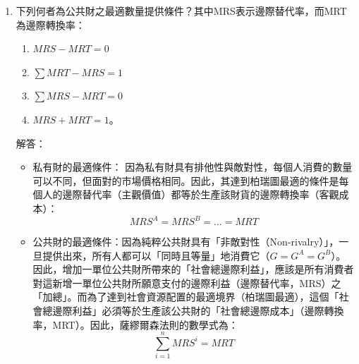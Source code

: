 \documentclass[12pt, a4paper]{article}
\begin{document}
\begin{enumerate}
    \item 下列何者為公共財之最適數量提供條件？其中MRS表示邊際替代率，而MRT為邊際轉換率：
    \begin{enumerate}[label=\Alph*.]
        \item \(MRS-MRT=0\)
        \item \(\sum MRT-MRS=1\)
        \item \(\sum MRS-MRT=0\)
        \item \(MRS+MRT=1\)。
    \end{enumerate}
    解答：
    \begin{itemize}
        \item 私有財的最適條件： 因為私有財具有排他性與敵對性，每個人消費的數量可以不同，但面對的市場價格相同。因此，其達到柏瑞圖最適的條件是每個人的邊際替代率（主觀價值）都等於生產該財貨的邊際轉換率（客觀成本）：
        \[
        MRS^A = MRS^B = \dots = MRT
        \]
        \item 公共財的最適條件：因為純粹公共財具有「非敵對性（Non-rivalry）」，一旦提供出來，所有人都可以「同時且等量」地消費它（\(G = G^A = G^B\)）。因此，增加一單位公共財所帶來的「社會總邊際利益」，應該是所有消費者對這新增一單位公共財所願意支付的邊際利益（邊際替代率，MRS）之「加總」。而為了達到社會資源配置的最適境界（柏瑞圖最適），這個「社會總邊際利益」必須等於生產該公共財的「社會總邊際成本」（邊際轉換率，MRT）。因此，薩繆爾森法則的數學式為：
        \[
        \sum_{i=1}^{n} MRS^i = MRT
        \]
    \end{itemize}

\end{enumerate}
\end{document}
